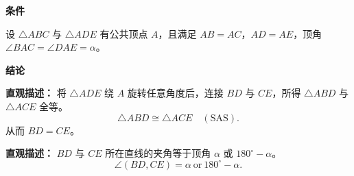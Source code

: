 \begin{statementbox}

	\textbf{\textcolor{CStatement}{条件}}
	\begin{description}[style=nextline, leftmargin=2.8em, labelsep=0.5em, itemsep=0.35em]
		\item[\textbf{\textcolor{CStatement}{条件 1（等腰共顶）：}}]
			设 $\triangle ABC$ 与 $\triangle ADE$ 有公共顶点 $A$，且满足 $AB = AC$，$AD = AE$，顶角 $\angle BAC = \angle DAE = \alpha$。
	\end{description}

	\textbf{\textcolor{CStatement}{结论}}
	\begin{description}[style=nextline, leftmargin=2.8em, labelsep=0.5em, itemsep=0.45em]
		\item[\textbf{\textcolor{CStatement}{结论一（旋转全等）：}}]
			\textbf{\textcolor{CStatement}{直观描述：}}
			将 $\triangle ADE$ 绕 $A$ 旋转任意角度后，连接 $BD$ 与 $CE$，所得 $\triangle ABD$ 与 $\triangle ACE$ 全等。
			\[
				\triangle ABD \cong \triangle ACE \quad (\text{SAS}).
			\]
			从而 $BD = CE$。

		\item[\textbf{\textcolor{CStatement}{推广结论（夹角关系）：}}]
			\textbf{\textcolor{CStatement}{直观描述：}}
			$BD$ 与 $CE$ 所在直线的夹角等于顶角 $\alpha$ 或 $180^\circ - \alpha$。
			\[
				\angle(BD, CE) = \alpha \ \text{or} \ 180^\circ - \alpha .
			\]
	\end{description}

\end{statementbox}
